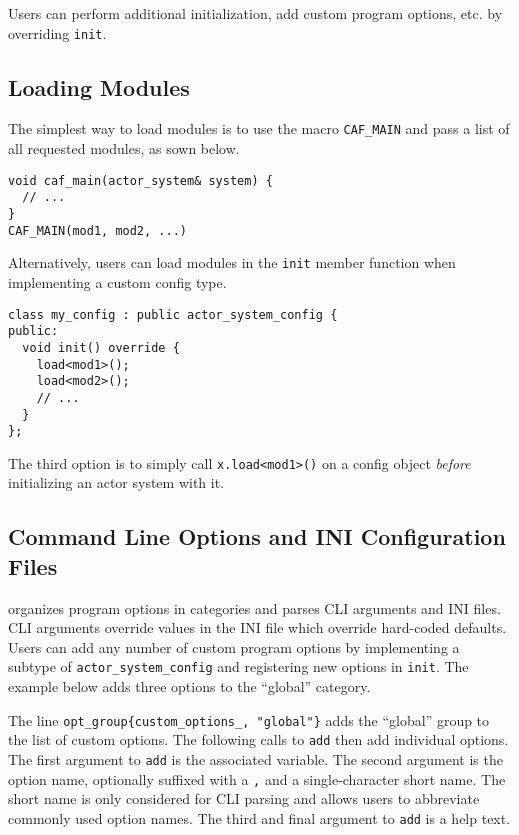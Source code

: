Users can perform additional initialization, add custom program options, etc. by overriding \lstinline^init^.

\subsection{Loading Modules}
\label{system-config-module}

The simplest way to load modules is to use the macro \lstinline^CAF_MAIN^ and pass a list of all requested modules, as sown below.

\begin{lstlisting}
void caf_main(actor_system& system) {
  // ...
}
CAF_MAIN(mod1, mod2, ...)
\end{lstlisting}

Alternatively, users can load modules in the \lstinline^init^ member function when implementing a custom config type.

\begin{lstlisting}
class my_config : public actor_system_config {
public:
  void init() override {
    load<mod1>();
    load<mod2>();
    // ...
  }
};
\end{lstlisting}

The third option is to simply call \lstinline^x.load<mod1>()^ on a config object \emph{before} initializing an actor system with it.

\subsection{Command Line Options and INI Configuration Files}
\label{system-config-options}

\lib organizes program options in categories and parses CLI arguments and INI files. CLI arguments override values in the INI file which override hard-coded defaults. Users can add any number of custom program options by implementing a subtype of \lstinline^actor_system_config^ and registering new options in \lstinline^init^. The example below adds three options to the ``global'' category.



The line \lstinline^opt_group{custom_options_, "global"}^ adds the ``global'' group to the list of custom options. The following calls to \lstinline^add^ then add individual options. The first argument to \lstinline^add^ is the associated variable. The second argument is the option name, optionally suffixed with a \lstinline^,^ and a single-character short name. The short name is only considered for CLI parsing and allows users to abbreviate commonly used option names. The third and final argument to \lstinline^add^ is a help text.

